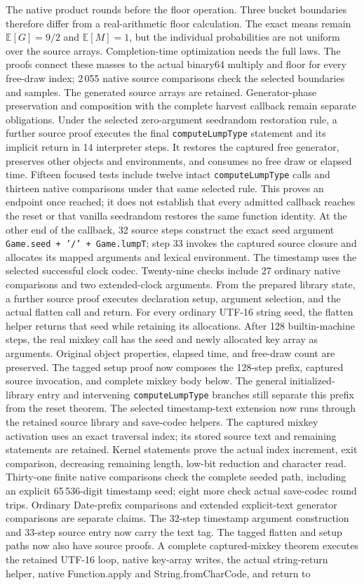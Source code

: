 \documentclass[11pt,a4paper]{article}
\numberwithin{equation}{section}
\theoremstyle{definition}
\theoremstyle{remark}
\begin{document}
The native product rounds before the floor operation. Three bucket boundaries therefore differ from a real-arithmetic floor calculation. The exact means remain $\mathbb{E}[G]=9/2$ and $\mathbb{E}[M]=1$, but the individual probabilities are not uniform over the source arrays. Completion-time optimization needs the full laws. The proofs connect these masses to the actual binary64 multiply and floor for every free-draw index; 2\,055 native source comparisons check the selected boundaries and samples. The generated source arrays are retained. Generator-phase preservation and composition with the complete harvest callback remain separate obligations. Under the selected zero-argument seedrandom restoration rule, a further source proof executes the final \texttt{computeLumpType} statement and its implicit return in 14 interpreter steps. It restores the captured free generator, preserves other objects and environments, and consumes no free draw or elapsed time. Fifteen focused tests include twelve intact \texttt{computeLumpType} calls and thirteen native comparisons under that same selected rule. This proves an endpoint once reached; it does not establish that every admitted callback reaches the reset or that vanilla seedrandom restores the same function identity. At the other end of the callback, 32 source steps construct the exact seed argument \texttt{Game.seed + '/' + Game.lumpT}; step 33 invokes the captured source closure and allocates its mapped arguments and lexical environment. The timestamp uses the selected successful clock codec. Twenty-nine checks include 27 ordinary native comparisons and two extended-clock arguments. From the prepared library state, a further source proof executes declaration setup, argument selection, and the actual flatten call and return. For every ordinary UTF-16 string seed, the flatten helper returns that seed while retaining its allocations. After 128 builtin-machine steps, the real mixkey call has the seed and newly allocated key array as arguments. Original object properties, elapsed time, and free-draw count are preserved. The tagged setup proof now composes the 128-step prefix, captured source invocation, and complete mixkey body below. The general initialized-library entry and intervening \texttt{computeLumpType} branches still separate this prefix from the reset theorem. The selected timestamp-text extension now runs through the retained source library and save-codec helpers. The captured mixkey activation uses an exact traversal index; its stored source text and remaining statements are retained. Kernel statements prove the actual index increment, exit comparison, decreasing remaining length, low-bit reduction and character read. Thirty-one finite native comparisons check the complete seeded path, including an explicit 65\,536-digit timestamp seed; eight more check actual save-codec round trips. Ordinary Date-prefix comparisons and extended explicit-text generator comparisons are separate claims. The 32-step timestamp argument construction and 33-step source entry now carry the text tag. The tagged flatten and setup paths now also have source proofs. A complete captured-mixkey theorem executes the retained UTF-16 loop, native key-array writes, the actual string-return helper, native Function.apply and String.fromCharCode, and return to 
\end{document}
